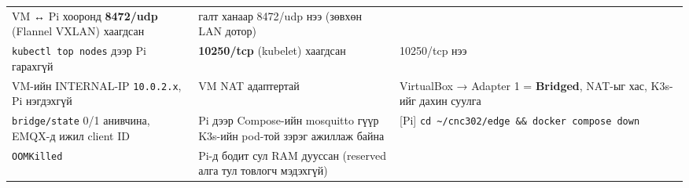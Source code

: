 \begin{longtable}[]{@{}lll@{}}
\begin{minipage}[t]{0.30\columnwidth}
VM ↔ Pi хооронд \textbf{8472/udp} (Flannel VXLAN) хаагдсан\strut
\end{minipage} & \begin{minipage}[t]{0.30\columnwidth}\raggedright
галт ханаар 8472/udp нээ (зөвхөн LAN дотор)\strut
\end{minipage}\tabularnewline
\begin{minipage}[t]{0.30\columnwidth}\raggedright
\texttt{kubectl\ top\ nodes} дээр Pi гарахгүй\strut
\end{minipage} & \begin{minipage}[t]{0.30\columnwidth}\raggedright
\textbf{10250/tcp} (kubelet) хаагдсан\strut
\end{minipage} & \begin{minipage}[t]{0.30\columnwidth}\raggedright
10250/tcp нээ\strut
\end{minipage}\tabularnewline
\begin{minipage}[t]{0.30\columnwidth}\raggedright
VM-ийн INTERNAL-IP \texttt{10.0.2.x}, Pi нэгдэхгүй\strut
\end{minipage} & \begin{minipage}[t]{0.30\columnwidth}\raggedright
VM NAT адаптертай\strut
\end{minipage} & \begin{minipage}[t]{0.30\columnwidth}\raggedright
VirtualBox → Adapter 1 = \textbf{Bridged}, NAT-ыг хас, K3s-ийг дахин суулга\strut
\end{minipage}\tabularnewline
\begin{minipage}[t]{0.30\columnwidth}\raggedright
\texttt{bridge/state} 0/1 анивчина, EMQX-д ижил client ID\strut
\end{minipage} & \begin{minipage}[t]{0.30\columnwidth}\raggedright
Pi дээр Compose-ийн mosquitto гүүр K3s-ийн pod-той зэрэг ажиллаж байна\strut
\end{minipage} & \begin{minipage}[t]{0.30\columnwidth}\raggedright
{[}Pi{]} \texttt{cd\ \textasciitilde{}/cnc302/edge\ \&\&\ docker\ compose\ down}\strut
\end{minipage}\tabularnewline
\begin{minipage}[t]{0.30\columnwidth}\raggedright
\texttt{OOMKilled}\strut
\end{minipage} & \begin{minipage}[t]{0.30\columnwidth}\raggedright
Pi-д бодит сул RAM дууссан (reserved алга тул товлогч мэдэхгүй)\strut
\end{minipage} & \begin{minipage}[t]{0.30\columnwidth}\raggedright

\end{minipage}
\end{longtable}
